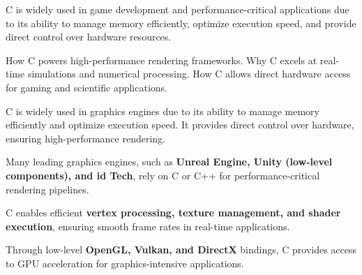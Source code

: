 \begin{NxSSSBox}
	\begin{NxIDBox}
		C is widely used in game development and performance-critical applications due to its ability to manage memory efficiently, optimize execution speed, and provide direct control over hardware resources.
	\end{NxIDBox}
	\begin{NxIDBoxL}
		 How C powers high-performance rendering frameworks.
		 Why C excels at real-time simulations and numerical processing.
		 How C allows direct hardware access for gaming and scientific applications.
	\end{NxIDBoxL}
\end{NxSSSBox}

\begin{NxSSSSBox}
	\begin{NxIDBox}
		C is widely used in graphics engines due to its ability to manage memory efficiently and optimize execution speed. It provides direct control over hardware, ensuring high-performance rendering.
	\end{NxIDBox}
	\begin{NxIDBox}
		Many leading graphics engines, such as \textbf{Unreal Engine, Unity (low-level components), and id Tech}, rely on C or C++ for performance-critical rendering pipelines.
	\end{NxIDBox}
	\begin{NxIDBox}
		C enables efficient \textbf{vertex processing, texture management, and shader execution}, ensuring smooth frame rates in real-time applications.
	\end{NxIDBox}
	\begin{NxIDBox}
		Through low-level \textbf{OpenGL, Vulkan, and DirectX} bindings, C provides access to GPU acceleration for graphics-intensive applications.
	\end{NxIDBox}
\end{NxSSSSBox}

